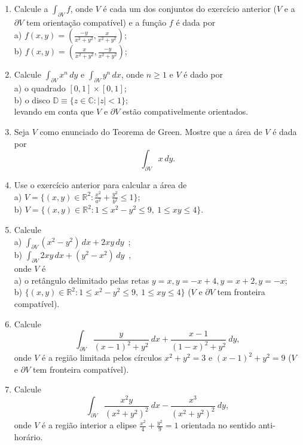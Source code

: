 \begin{enumerate}[leftmargin=*]
	\item Calcule a $\int_{\partial V} f$, onde $V$ é cada um dos conjuntos do exercício anterior ($V$ e a $\partial V$ tem orientação compatível) 
	e a função $f$ é dada por \\[0.2cm]
	a) $f(x,y)=\left(\displaystyle\frac{-y}{x^2+y^2},\frac{x}{x^2+y^2}\right)$;\\[0.3cm]
	b) $f(x,y)=\left(\displaystyle\frac{x}{x^2+y^2},\frac{-y}{x^2+y^2}\right)$;\\
	\item Calcule $\int_{\partial V}x^n\, dy$ e $\int_{\partial V}y^n\, dx$, onde $n\geq 1$ e $V$ é dado por \\
	a) o quadrado $[0,1]\times [0,1]$;\\
	b) o disco $\mathbb{D}\equiv \{z\in\mathbb{C}: |z|< 1\}$;\\ 
	levando em conta que $V$ e $\partial V$ estão compativelmente orientados.
	\item Seja $V$ como enunciado do Teorema de Green. Mostre que a área de $V$ é dada por 
	$$
	\int_{\partial V} x\, dy.
	$$
	\item Use o exercício anterior para calcular a área de\\
	a) $V=\{(x,y)\in\mathbb{R}^2: \frac{x^2}{a^2}+\frac{y^2}{b^2}\leq 1\}$;\\
	b) $V=\{(x,y)\in\mathbb{R}^2: 1\leq x^2-y^2\leq 9, \ 1\leq xy\leq 4\}$.
	\item Calcule 
	\\[0.2cm]
	a) $\displaystyle\int_{\partial V} (x^2-y^2)\, dx+ 2xy \, dy$\ ;\\[0.5cm]
	b) $\displaystyle \int_{\partial V} 2xy\, dx+ (y^2-x^2) \, dy$\ ,\\[0.5cm]
	onde $V$ é \\
	a) o retângulo delimitado pelas retas $y=x, y=-x+4, y=x+2, y=-x$;\\
	b) $\{(x,y)\in\mathbb{R}^2: 1\leq x^2-y^2\leq 9, \ 1\leq xy\leq 4\}$ ($V$ e $\partial V$ tem fronteira compatível). 
	\item Calcule 
	$$
	\int_{\partial V} \frac{y}{(x-1)^2+y^2}\ dx + \frac{x-1}{(1-x)^2+y^2}\ dy,
	$$
	onde $V$ é a região limitada pelos círculos $x^2+y^2=3$ e $(x-1)^2+y^2=9$ ($V$ e $\partial V$ tem fronteira compatível). 
	\item Calcule 
	$$
	\int_{\partial V} \frac{x^2y}{(x^2+y^2)^2}\ dx - \frac{x^3}{(x^2+y^2)^2}\ dy,
	$$
	onde $V$ é a região interior a elipse $\frac{x^2}{4}+\frac{y^2}{9}=1$ orientada no sentido anti-horário. 


\end{enumerate}